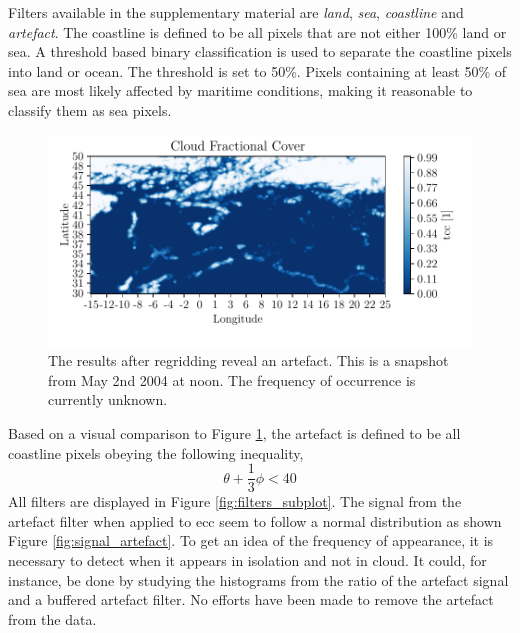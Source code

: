 Filters available in the supplementary material are \textit{land}, \textit{sea}, \textit{coastline} and \textit{artefact}. The coastline is defined to be all pixels that are not either 100\% land or sea. A threshold based binary classification is used to separate the coastline pixels into land or ocean. The threshold is set to 50\%. Pixels containing at least 50\% of sea are most likely affected by maritime conditions, making it reasonable to classify them as sea pixels.
\begin{figure}
    \centering
    \includegraphics{python_figs/example_artefact.pdf}
    \caption[Artefact in European Cloud Cover dataset.]{The results after regridding reveal an artefact. This is a snapshot from May 2nd 2004 at noon. The frequency of occurrence is currently unknown.}
    \label{fig:example_artefact}
\end{figure}
Based on a visual comparison to Figure \ref{fig:example_artefact}, the artefact is defined to be all coastline pixels obeying the following inequality,  %
\begin{equation} \label{eq:artefact_condition}
    \theta + \frac{1}{3}\phi < 40
\end{equation}
All filters are displayed in Figure \ref{fig:filters_subplot}. 
The signal from the artefact filter when applied to \acrshort{ecc} seem to follow a normal distribution as shown Figure \ref{fig:signal_artefact}. To get an idea of the frequency of appearance, it is necessary to detect when it appears in isolation and not in cloud. It could, for instance, be done by studying the histograms from the ratio of the artefact signal and a buffered artefact filter.
No efforts have been made to remove the artefact from the data. %

